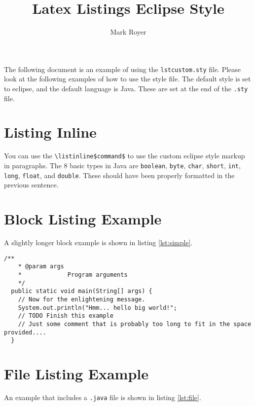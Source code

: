 \documentclass{article}
\title{Latex Listings Eclipse Style}
\date{}
\author{Mark Royer}
\begin{document}
\abstract

The following document is an example of using the
\texttt{lstcustom.sty} file.  Please look at the following examples
of how to use the style file. The default style is set to eclipse, and
the default language is Java.  These are set at the end of the
\texttt{.sty} file.

\section*{Listing Inline}

\lstset{breaklines=false}

You can use the \texttt{\textbackslash listinline\$command\$} to use the custom
eclipse style markup in paragraphs.  The 8 basic types in Java are
\lstinline$boolean$, \lstinline$byte$, \lstinline$char$,
\lstinline$short$, \lstinline$int$, \lstinline$long$,
\lstinline$float$, and \lstinline$double$. These should have been
properly formatted in the previous sentence.

\lstset{breaklines=true}

\section*{Block Listing Example}

A slightly longer block example is shown in listing \ref{lst:simple}.

\begin{lstlisting}[caption={A simple listing.}, label={lst:simple}]
  /**
    * @param args
    *             Program arguments
    */
  public static void main(String[] args) {
    // Now for the enlightening message.
    System.out.println("Hmm... hello big world!";
    // TODO Finish this example
    // Just some comment that is probably too long to fit in the space provided....
  }
\end{lstlisting}

\section*{File Listing Example}

An example that includes a \texttt{.java} file is shown in listing \ref{lst:file}.


\end{document}
